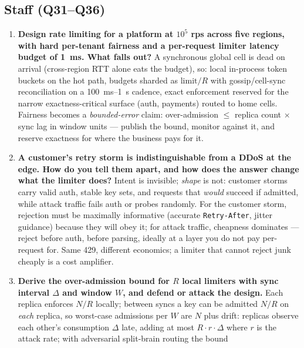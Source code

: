 \subsection*{Staff (Q31--Q36)}
\begin{enumerate}[label=\textbf{Q\arabic*.}, leftmargin=1.6cm, start=31]
  \item \textbf{Design rate limiting for a platform at $10^5$ rps across
        five regions, with hard per-tenant fairness and a per-request
        limiter latency budget of 1~ms. What falls out?}
        A synchronous global cell is dead on arrival (cross-region RTT
        alone eats the budget), so: local in-process token buckets on the
        hot path, budgets sharded as $\mathrm{limit}/R$ with
        gossip/cell-sync reconciliation on a 100~ms--1~s cadence, exact
        enforcement reserved for the narrow exactness-critical surface
        (auth, payments) routed to home cells. Fairness becomes a
        \emph{bounded-error} claim: over-admission $\le$ replica count
        $\times$ sync lag in window units --- publish the bound, monitor
        against it, and reserve exactness for where the business pays for
        it.
  \item \textbf{A customer's retry storm is indistinguishable from a DDoS
        at the edge. How do you tell them apart, and how does the answer
        change what the limiter does?}
        Intent is invisible; \emph{shape} is not: customer storms carry
        valid auth, stable key sets, and requests that \emph{would} succeed
        if admitted, while attack traffic fails auth or probes randomly.
        For the customer storm, rejection must be maximally informative
        (accurate \texttt{Retry-After}, jitter guidance) because they will
        obey it; for attack traffic, cheapness dominates --- reject before
        auth, before parsing, ideally at a layer you do not pay per-request
        for. Same 429, different economics; a limiter that cannot reject
        junk cheaply is a cost amplifier.
  \item \textbf{Derive the over-admission bound for $R$ local limiters with
        sync interval $\Delta$ and window $W$, and defend or attack the
        design.}
        Each replica enforces $N/R$ locally; between syncs a key can be
        admitted $N/R$ on \emph{each} replica, so worst-case admissions per
        $W$ are $N$ plus drift: replicas observe each other's consumption
        $\Delta$ late, adding at most $R \cdot r \cdot \Delta$ where $r$ is
        the attack rate; with adversarial split-brain routing the bound

\end{enumerate}
